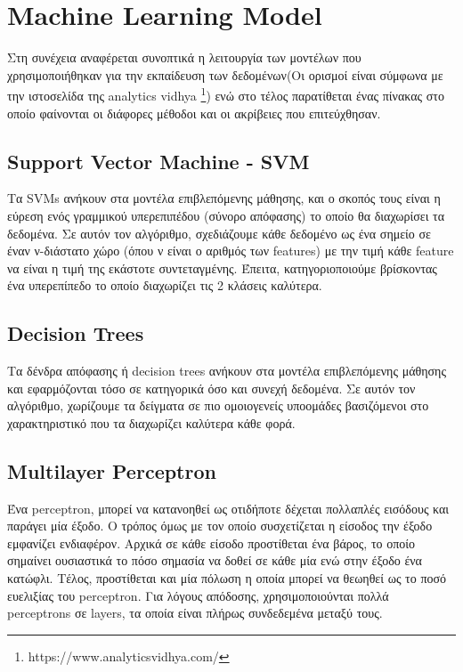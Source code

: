 \section{Machine Learning Model}

Στη συνέχεια αναφέρεται συνοπτικά η λειτουργία των μοντέλων που χρησιμοποιήθηκαν για την εκπαίδευση των δεδομένων(Οι ορισμοί είναι σύμφωνα με την ιστοσελίδα της analytics vidhya \footnote{https://www.analyticsvidhya.com/}) ενώ στο τέλος παρατίθεται ένας πίνακας στο οποίο φαίνονται οι διάφορες μέθοδοι και οι ακρίβειες που επιτεύχθησαν.

\subsection{Support Vector Machine - SVM}

Τα SVMs ανήκουν στα μοντέλα επιβλεπόμενης μάθησης, και ο σκοπός τους είναι η εύρεση ενός γραμμικού υπερεπιπέδου (σύνορο απόφασης) το οποίο θα διαχωρίσει τα δεδομένα. Σε αυτόν τον αλγόριθμο, σχεδιάζουμε κάθε δεδομένο ως ένα σημείο σε έναν ν-διάστατο χώρο (όπου ν είναι ο αριθμός των features) με την τιμή κάθε feature να είναι η τιμή της εκάστοτε συντεταγμένης. Έπειτα, κατηγοριοποιούμε βρίσκοντας ένα υπερεπίπεδο το οποίο διαχωρίζει τις 2 κλάσεις καλύτερα.

\subsection{Decision Trees}

Τα δένδρα απόφασης ή decision trees ανήκουν στα μοντέλα επιβλεπόμενης μάθησης και εφαρμόζονται τόσο σε κατηγορικά όσο και συνεχή δεδομένα. Σε αυτόν τον αλγόριθμο, χωρίζουμε τα δείγματα σε πιο ομοιογενείς υποομάδες βασιζόμενοι στο χαρακτηριστικό που τα διαχωρίζει καλύτερα κάθε φορά.

\subsection{Multilayer Perceptron}

Ένα perceptron, μπορεί να κατανοηθεί ως οτιδήποτε δέχεται πολλαπλές εισόδους και παράγει μία έξοδο. Ο τρόπος όμως με τον οποίο συσχετίζεται η είσοδος την έξοδο εμφανίζει ενδιαφέρον. Αρχικά σε κάθε είσοδο προστίθεται ένα βάρος, το οποίο σημαίνει ουσιαστικά το πόσο σημασία να δοθεί σε κάθε μία ενώ στην έξοδο ένα κατώφλι. Τέλος, προστίθεται και μία πόλωση η οποία μπορεί να θεωηθεί ως το ποσό ευελιξίας του perceptron. Για λόγους απόδοσης, χρησιμοποιούνται πολλά perceptrons σε layers, τα οποία είναι πλήρως συνδεδεμένα μεταξύ τους.   

